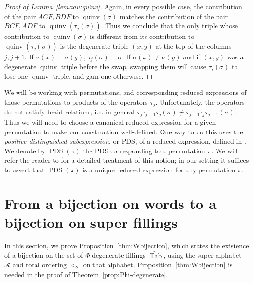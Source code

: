 \documentclass[ALCO,Unicode]{cedram}
\DeclareMathOperator{\PQT}{Tab}
\DeclareMathOperator{\PDS}{PDS}
\DeclareMathOperator{\quinv}{quinv}
\begin{document}
\begin{proof}[Proof of Lemma~\ref{lem:tau:quinv}]
\medskip
Again, in every possible case, the contribution of the pair $ACF, BDF$ to $\quinv(\sigma)$ matches the contribution of the pair $BCF, ADF$ to $\quinv(\tau_j(\sigma))$. Thus we conclude that the only triple whose contribution to $\quinv(\sigma)$ is different from its contribution to $\quinv(\tau_j(\sigma))$ is the degenerate triple $(x,y)$ at the top of the columns $j,j+1$. If $\sigma(x)=\sigma(y)$, $\tau_j(\sigma)=\sigma$. If $\sigma(x)\neq \sigma(y)$ and if $(x,y)$ was a degenerate $\quinv$ triple before the swap, swapping them will cause $\tau_i(\sigma)$ to lose one $\quinv$ triple, and gain one otherwise. 
\end{proof}

\begin{remark}\label{rem:PDS}
We will be working with permutations, and corresponding reduced expressions of those permutations to products of the operators $\tau_j$. Unfortunately, the operators do not satisfy braid relations, i.e. in general $\tau_j\tau_{j+1}\tau_j(\sigma) \neq \tau_{j+1}\tau_j\allowbreak \tau_{j+1}(\sigma)$. Thus we will need to choose a canonical reduced expression for a given permutation to make our construction well-defined. One way to do this uses the \emph{positive distinguished subexpression}, or PDS, of a reduced expression, defined in \cite{MarshRietsch}. We denote by $\PDS(\pi)$ the PDS corresponding to a permutation $\pi$. We will refer the reader to \cite[Section 3]{compactformula} for a detailed treatment of this notion; in our setting it suffices to assert that $\PDS(\pi)$ is a unique reduced expression for any permutation $\pi$.
\end{remark} 

\section{From a bijection on words to a bijection on 
super fillings}
\label{sec:bijPQT}

In this section, we prove Proposition~\ref{thm:Wbijection}, which states the existence of a bijection on the set of $\Phi$-degenerate fillings $\widetilde{\PQT}$, using the super-alphabet $\mathcal{A}$ and total ordering $<_2$ on that alphabet. Proposition~\ref{thm:Wbijection} is needed in the proof of Theorem~\ref{prop:Phi-degenerate}.
\end{document}
